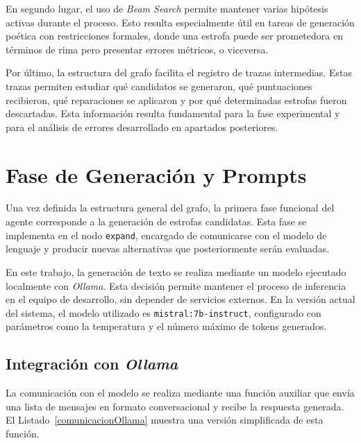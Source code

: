 \documentclass[12pt,a4paper,twoside,openright]{book}
\begin{document}
En segundo lugar, el uso de \emph{Beam Search} permite mantener varias hipótesis activas durante el proceso. Esto resulta especialmente útil en tareas de generación poética con restricciones formales, donde una estrofa puede ser prometedora en términos de rima pero presentar errores métricos, o viceversa.

Por último, la estructura del grafo facilita el registro de trazas intermedias. Estas trazas permiten estudiar qué candidatos se generaron, qué puntuaciones recibieron, qué reparaciones se aplicaron y por qué determinadas estrofas fueron descartadas. Esta información resulta fundamental para la fase experimental y para el análisis
de errores desarrollado en apartados posteriores.



\section{Fase de Generación y Prompts} %

Una vez definida la estructura general del grafo, la primera fase funcional del agente corresponde a la generación de estrofas candidatas. Esta fase se implementa en el nodo \texttt{expand}, encargado de comunicarse con el modelo de lenguaje y producir nuevas
alternativas que posteriormente serán evaluadas.

En este trabajo, la generación de texto se realiza mediante un modelo ejecutado localmente con \emph{Ollama}. Esta decisión permite mantener el proceso de inferencia en el equipo de desarrollo, sin depender de servicios externos.
En la versión actual del sistema, el modelo utilizado es \texttt{mistral:7b-instruct}, configurado con parámetros como la temperatura y el número máximo de tokens generados.


\subsection{Integración con \emph{Ollama}}

La comunicación con el modelo se realiza mediante una función auxiliar que envía una lista de mensajes en formato conversacional y recibe la respuesta generada. El Listado~\ref{comunicacionOllama} muestra una versión simplificada de esta función.
\end{document}
